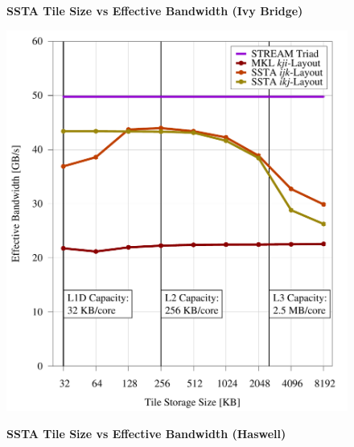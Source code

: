 \documentclass{sig-alternate-05-2015}
\begin{document}
\begin{figure}[!bth]
  \captionsetup{width=0.39\textwidth}
  \centering
  \begin{minipage}{0.49\textwidth}
    \centering
    \label{fig:results:tile_size_ivb}
    \caption{
      \textbf{SSTA Tile Size vs Effective Bandwidth (Ivy Bridge)}
    }
    \includegraphics[width=0.99\columnwidth]{figures/post_tsb_tw_sweep_full_matrix_double_precision_production_edison_ivb_e5_2695_v2_08_31_2016_09_03_2016_12pus.pdf}
  \end{minipage}
  \begin{minipage}{0.49\textwidth}
    \centering
    \label{fig:results:tile_size_hsw}
    \caption{
      \textbf{SSTA Tile Size vs Effective Bandwidth (Haswell)}
    }

\end{minipage}
\end{figure}
\end{document}
